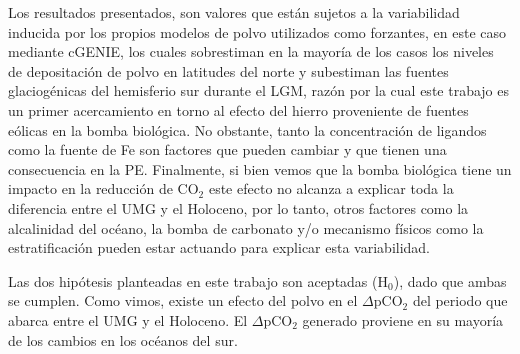 Los resultados presentados, son valores que están sujetos a la variabilidad inducida por los propios modelos de polvo utilizados como forzantes, en este caso mediante cGENIE, los cuales sobrestiman en la mayoría de los casos los niveles de depositación de polvo en latitudes del norte y subestiman las fuentes glaciogénicas del hemisferio sur durante el LGM, razón por la cual este trabajo es un primer acercamiento en torno al efecto del hierro proveniente de fuentes eólicas en la bomba biológica. No obstante, tanto la concentración de ligandos como la fuente de Fe son factores que pueden cambiar y que tienen una consecuencia en la PE. Finalmente, si bien vemos que la bomba biológica tiene un impacto en la reducción de CO$_2$ este efecto no alcanza a explicar toda la diferencia entre el UMG y el Holoceno, por lo tanto, otros factores como la alcalinidad del océano, la bomba de carbonato y/o mecanismo físicos como la estratificaci\'on pueden estar actuando para explicar esta variabilidad.  

Las dos hipótesis planteadas en este trabajo son aceptadas (H$_{0}$), dado que ambas se cumplen. Como vimos, existe un efecto del polvo en el $\Delta$pCO$_{2}$ del periodo que abarca entre el UMG y el Holoceno. El $\Delta$pCO$_{2}$ generado proviene en su mayoría de los cambios en los océanos del sur. 



